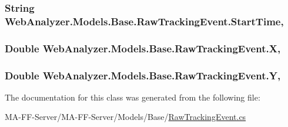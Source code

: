 \subsubsection[{Start\+Time}]{\setlength{\rightskip}{0pt plus 5cm}String Web\+Analyzer.\+Models.\+Base.\+Raw\+Tracking\+Event.\+Start\+Time\hspace{0.3cm}{\ttfamily [get]}, {\ttfamily [set]}}\label{class_web_analyzer_1_1_models_1_1_base_1_1_raw_tracking_event_a1af115e943c8a05d912c9370e8c9af36}
\hypertarget{class_web_analyzer_1_1_models_1_1_base_1_1_raw_tracking_event_ab5a8776cb0eb8f3d4cc89a25f3a16495}{}
\subsubsection[{X}]{\setlength{\rightskip}{0pt plus 5cm}Double Web\+Analyzer.\+Models.\+Base.\+Raw\+Tracking\+Event.\+X\hspace{0.3cm}{\ttfamily [get]}, {\ttfamily [set]}}\label{class_web_analyzer_1_1_models_1_1_base_1_1_raw_tracking_event_ab5a8776cb0eb8f3d4cc89a25f3a16495}
\hypertarget{class_web_analyzer_1_1_models_1_1_base_1_1_raw_tracking_event_afda6b7de37da6ad8950ecf5608e25dab}{}
\subsubsection[{Y}]{\setlength{\rightskip}{0pt plus 5cm}Double Web\+Analyzer.\+Models.\+Base.\+Raw\+Tracking\+Event.\+Y\hspace{0.3cm}{\ttfamily [get]}, {\ttfamily [set]}}\label{class_web_analyzer_1_1_models_1_1_base_1_1_raw_tracking_event_afda6b7de37da6ad8950ecf5608e25dab}


The documentation for this class was generated from the following file\+:\begin{DoxyCompactItemize}
\item 
M\+A-\/\+F\+F-\/\+Server/\+M\+A-\/\+F\+F-\/\+Server/\+Models/\+Base/\hyperlink{_raw_tracking_event_8cs}{Raw\+Tracking\+Event.\+cs}\end{DoxyCompactItemize}

